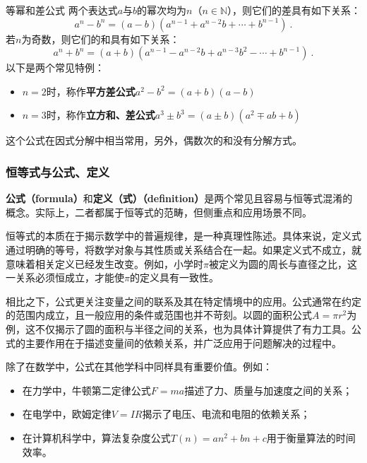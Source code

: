 \begin{theorem}{等幂和差公式}
两个表达式$a$与$b$的幂次均为$n$（$n\in\mathbb{N}$），则它们的差具有如下关系：
\begin{equation}
a^n - b^n = (a - b)(a^{n-1} + a^{n-2}b + \cdots + b^{n-1})~.
\end{equation}
若$n$为奇数，则它们的和具有如下关系：
\begin{equation}
a^n + b^n = (a + b)(a^{n-1} - a^{n-2}b + a^{n-3}b^2 - \cdots + b^{n-1})~.
\end{equation}
以下是两个常见特例：
\begin{itemize}
\item $n=2$时，称作\textbf{平方差公式}$a^2-b^2=(a+b)(a-b)$
\item $n=3$时，称作\textbf{立方和、差公式}$a^3\pm b^3=(a\pm b)(a^2\mp ab+b)$
\end{itemize}
\end{theorem}

这个公式在因式分解中相当常用，另外，偶数次的和没有分解方式。

\subsubsection{恒等式与公式、定义}

\textbf{公式（formula）}和\textbf{定义（式）（definition）}是两个常见且容易与恒等式混淆的概念。实际上，二者都属于恒等式的范畴，但侧重点和应用场景不同。

恒等式的本质在于揭示数学中的普遍规律，是一种真理性陈述。具体来说，定义式通过明确的等号，将数学对象与其性质或关系结合在一起。如果定义式不成立，就意味着相关定义已经发生改变。例如，小学时$\pi$被定义为圆的周长与直径之比，这一关系必须恒成立，才能使$\pi$的定义具有一致性。

相比之下，公式更关注变量之间的联系及其在特定情境中的应用。公式通常在约定的范围内成立，且一般应用的条件或范围也并不苛刻。以圆的面积公式$A = \pi r^2$为例，这不仅揭示了圆的面积与半径之间的关系，也为具体计算提供了有力工具。公式的主要作用在于描述变量间的依赖关系，并广泛应用于问题解决的过程中。

除了在数学中，公式在其他学科中同样具有重要价值。例如：
\begin{itemize}
\item 在力学中，牛顿第二定律公式$F = ma$描述了力、质量与加速度之间的关系；
\item 在电学中，欧姆定律$V = IR$揭示了电压、电流和电阻的依赖关系；
\item 在计算机科学中，算法复杂度公式$T(n) = an^2 + bn + c$用于衡量算法的时间效率。
\end{itemize}

